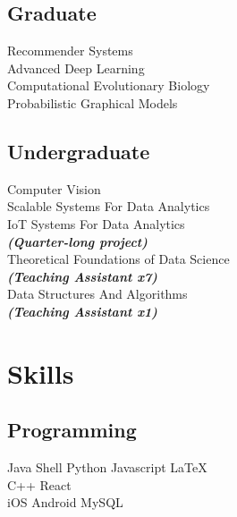 \documentclass[]{deedy-resume-openfont}
\begin{document}
\begin{minipage}[t]{0.33\textwidth}
\subsection{Graduate}
Recommender Systems\\
Advanced Deep Learning\\
Computational Evolutionary Biology\\
Probabilistic Graphical Models\\
\sectionsep

\subsection{Undergraduate}
Computer Vision\\
Scalable Systems For Data Analytics\\
IoT Systems For Data Analytics\\
{\footnotesize \textit{\textbf{(Quarter-long project) }}} \\
Theoretical Foundations of Data Science\\
{\footnotesize \textit{\textbf{(Teaching Assistant x7) }}} \\
Data Structures And Algorithms\\
{\footnotesize \textit{\textbf{(Teaching Assistant x1) }}} \\


\section{Skills}
\subsection{Programming}

Java \textbullet{}   Shell \textbullet{} Python \textbullet{} Javascript \LaTeX\ \\
C++ \textbullet{} React \textbullet{} \\

iOS \textbullet{} Android \textbullet{} MySQL
\sectionsep

%
%

\end{minipage}
\hfill
\end{document}
